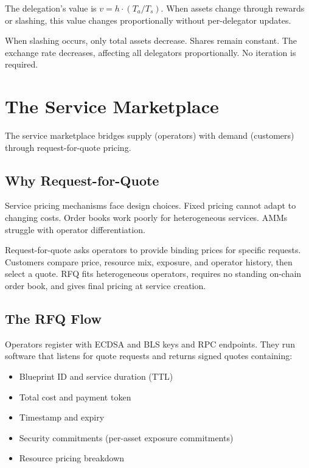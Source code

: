 \documentclass[11pt,a4paper]{article}
\begin{document}
The delegation's value is $v = h \cdot (T_a / T_s)$. When assets change through rewards or slashing, this value changes proportionally without per-delegator updates.

When slashing occurs, only total assets decrease. Shares remain constant. The exchange rate decreases, affecting all delegators proportionally. No iteration is required.

\section{The Service Marketplace}
\label{sec:marketplace}

The service marketplace bridges supply (operators) with demand (customers) through request-for-quote pricing.

\subsection{Why Request-for-Quote}

Service pricing mechanisms face design choices. Fixed pricing cannot adapt to changing costs. Order books work poorly for heterogeneous services. AMMs struggle with operator differentiation.

Request-for-quote asks operators to provide binding prices for specific requests. Customers compare price, resource mix, exposure, and operator history, then select a quote. RFQ fits heterogeneous operators, requires no standing on-chain order book, and gives final pricing at service creation.

\subsection{The RFQ Flow}

Operators register with ECDSA and BLS keys and RPC endpoints. They run software that listens for quote requests and returns signed quotes containing:
\begin{itemize}[noitemsep]
    \item Blueprint ID and service duration (TTL)
    \item Total cost and payment token
    \item Timestamp and expiry
    \item Security commitments (per-asset exposure commitments)
    \item Resource pricing breakdown
\end{itemize}
\end{document}
